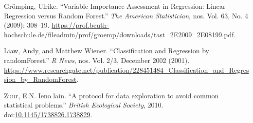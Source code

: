 \documentclass[a4paper, nobind]{templates/ociamthesis}
\newcommand*{\bibtitle}{Works Cited}
\begin{document}
\hypertarget{refs}{}
\leavevmode\hypertarget{ref-Groemping2009}{}%
Grömping, Ulrike. ``Variable Importance Assessment in Regression: Linear Regression versus Random Forest.'' \emph{The American Statistician}, nos. Vol. 63, No. 4 (2009): 308--19. \url{https://prof.beuth-hochschule.de/fileadmin/prof/groemp/downloads/tast_2E2009_2E08199.pdf}.

\leavevmode\hypertarget{ref-Liaw2002}{}%
Liaw, Andy, and Matthew Wiener. ``Classification and Regression by randomForest.'' \emph{R News}, nos. Vol. 2/3, December 2002 (2001). \url{https://www.researchgate.net/publication/228451484_Classification_and_Regression_by_RandomForest}.

\leavevmode\hypertarget{ref-Zuur2010}{}%
Zuur, E.N. Ieno lain. ``A protocol for data exploration to avoid common statistical problems.'' \emph{British Ecological Society}, 2010. doi:\href{https://doi.org/10.1145/1738826.1738829}{10.1145/1738826.1738829}.




\setlength{\baselineskip}{0pt} %

{\renewcommand*\MakeUppercase[1]{#1}%
\printbibliography[heading=bibintoc,title={\bibtitle}]}
\end{document}

